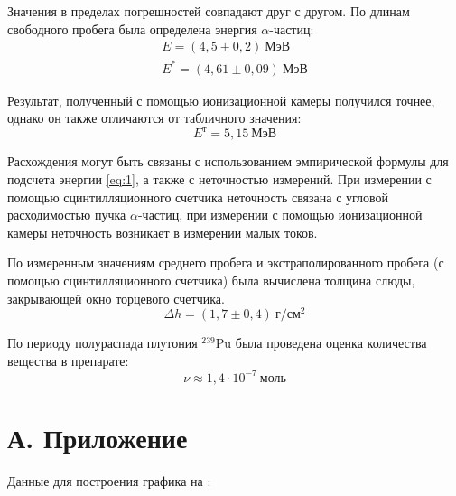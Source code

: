 \documentclass[a4paper, 12pt]{article}
\begin{document}
Значения в пределах погрешностей совпадают друг с другом. По длинам
свободного пробега была определена энергия $\alpha$-частиц:
\begin{equation*}
    \begin{gathered}
    E = (4,5 \pm 0,2)\: \text{МэВ}\\
    E^* = (4,61 \pm 0,09)\: \text{МэВ}
    \end{gathered}
\end{equation*}

Результат, полученный с помощью ионизационной камеры получился
точнее, однако он также отличаются от табличного значения:
\[
    E^\text{т} = 5,15\: \text{МэВ}
\]

Расхождения могут быть связаны с использованием эмпирической формулы
для подсчета энергии \eqref{eq:1}, а также с неточностью измерений.
При измерении с помощью сцинтилляционного счетчика неточность связана
с угловой расходимостью пучка $\alpha$-частиц, при измерении с помощью
ионизационной камеры неточность возникает в измерении малых токов.

По измеренным значениям среднего пробега и экстраполированного пробега
(с помощью сцинтилляционного счетчика)
была вычислена толщина слюды, закрывающей окно торцевого счетчика.
\[
    \Delta h = (1,7 \pm 0,4)\: \text{г}/\text{см}^2
\]

По периоду полураспада плутония $ ^{239} \text{Pu}$ была проведена
оценка количества вещества в препарате:
\[
        \nu \approx 1,4 \cdot 10 ^{-7}\: \text{моль}
\]


\section*{А. Приложение}
Данные для построения графика на :
\end{document}

